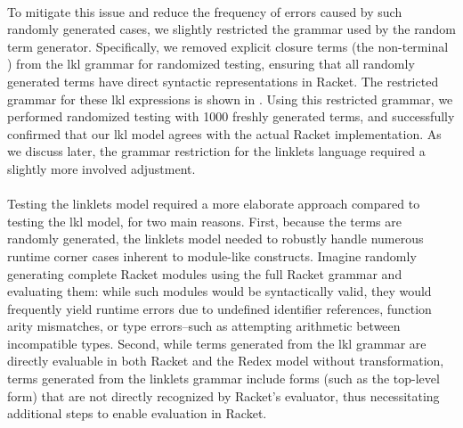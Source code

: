 			\paragraph{}%
				To mitigate this issue and reduce the frequency of errors caused by such randomly generated cases, we slightly restricted the grammar used by the random term generator. Specifically, we removed explicit closure terms (the non-terminal ) from the \gls{lkl} grammar for randomized testing, ensuring that all randomly generated terms have direct syntactic representations in Racket. The restricted grammar for these \gls{lkl} expressions is shown in . Using this restricted grammar, we performed randomized testing with 1000 freshly generated terms, and successfully confirmed that our \gls{lkl} model agrees with the actual Racket implementation. As we discuss later, the grammar restriction for the linklets language required a slightly more involved adjustment.

			\paragraph{}%
				Testing the linklets model required a more elaborate approach compared to testing the \gls{lkl} model, for two main reasons. First, because the terms are randomly generated, the linklets model needed to robustly handle numerous runtime corner cases inherent to module-like constructs. Imagine randomly generating complete Racket modules using the full Racket grammar and evaluating them: while such modules would be syntactically valid, they would frequently yield runtime errors due to undefined identifier references, function arity mismatches, or type errors--such as attempting arithmetic between incompatible types. Second, while terms generated from the \gls{lkl} grammar are directly evaluable in both Racket and the Redex model without transformation, terms generated from the linklets grammar include forms (such as the top-level  form) that are not directly recognized by Racket’s evaluator, thus necessitating additional steps to enable evaluation in Racket.


